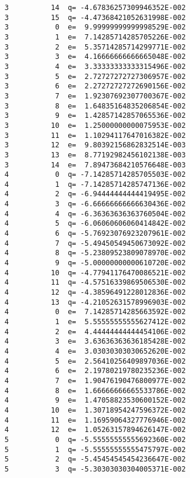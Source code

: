 \documentclass{article}
\begin{document}
\begin{verbatim}
           3          14  q= -4.67836257309946352E-002
           3          15  q= -4.47368421052631998E-002
           3           0  e=  9.99999999999998529E-002
           3           1  e=  7.14285714285705226E-002
           3           2  e=  5.35714285714299771E-002
           3           3  e=  4.16666666666665048E-002
           3           4  e=  3.33333333333315496E-002
           3           5  e=  2.72727272727306957E-002
           3           6  e=  2.27272727272690156E-002
           3           7  e=  1.92307692307700367E-002
           3           8  e=  1.64835164835206854E-002
           3           9  e=  1.42857142857065536E-002
           3          10  e=  1.25000000000075953E-002
           3          11  e=  1.10294117647016382E-002
           3          12  e=  9.80392156862832514E-003
           3          13  e=  8.77192982456102138E-003
           3          14  e=  7.89473684210576648E-003
           4           0  q= -7.14285714285705503E-002
           4           1  q= -7.14285714285747136E-002
           4           2  q= -6.94444444444419495E-002
           4           3  q= -6.66666666666630436E-002
           4           4  q= -6.36363636363760504E-002
           4           5  q= -6.06060606060414842E-002
           4           6  q= -5.76923076923207961E-002
           4           7  q= -5.49450549450673092E-002
           4           8  q= -5.23809523809078970E-002
           4           9  q= -5.00000000000610720E-002
           4          10  q= -4.77941176470086521E-002
           4          11  q= -4.57516339869506530E-002
           4          12  q= -4.38596491228012836E-002
           4          13  q= -4.21052631578996903E-002
           4           0  e=  7.14285714285663592E-002
           4           1  e=  5.55555555555627412E-002
           4           2  e=  4.44444444444454106E-002
           4           3  e=  3.63636363636185428E-002
           4           4  e=  3.03030303030652620E-002
           4           5  e=  2.56410256409897036E-002
           4           6  e=  2.19780219780235236E-002
           4           7  e=  1.90476190476800977E-002
           4           8  e=  1.66666666665533786E-002
           4           9  e=  1.47058823530600152E-002
           4          10  e=  1.30718954247596372E-002
           4          11  e=  1.16959064327776946E-002
           4          12  e=  1.05263157894626147E-002
           5           0  q= -5.55555555555692360E-002
           5           1  q= -5.55555555555475797E-002
           5           2  q= -5.45454545454236647E-002
           5           3  q= -5.30303030304005371E-002

\end{verbatim}
\end{document}
